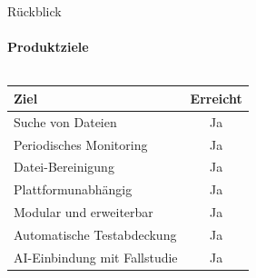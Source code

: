 \documentclass[
    ngerman,%
    authorontitle=true,
]{bfhbeamer}
\begin{document}
    \begin{frame}{Rückblick}
        \framesubtitle{Produktziele}
        \begin{columns}
            \begin{column}{0.5\textwidth}
                \begin{tabular}{l|c}
                    \textbf{Ziel}                & \textbf{Erreicht} \\
                    \hline
                    Suche von Dateien            & Ja                \\
                    Periodisches Monitoring      & Ja                \\
                    Datei-Bereinigung            & Ja                \\
                    Plattformunabhängig          & Ja                \\
                    Modular und erweiterbar      & Ja                \\
                    Automatische Testabdeckung   & Ja                \\
                    AI-Einbindung mit Fallstudie & Ja                \\
                \end{tabular}\par
            \end{column}
            \begin{column}{0.5\textwidth}
            \end{column}
        \end{columns}
    \end{frame}
\end{document}
